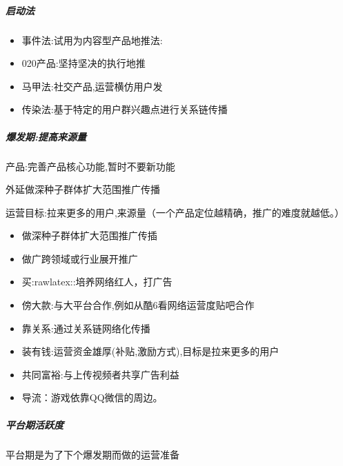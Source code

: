 \documentclass[letterpaper,10pt,english]{sphinxmanual}
\begin{document}
\subparagraph{启动法}
\label{\detokenize{chapter_idea/GTM:id10}}\begin{itemize}
\item {} 
事件法:试用为内容型产品地推法:

\item {} 
020产品:坚持坚决的执行地推

\item {} 
马甲法:社交产品,运营横仿用户发

\item {} 
传染法:基于特定的用户群兴趣点进行关系链传播

\end{itemize}


\subparagraph{爆发期:提高来源量}
\label{\detokenize{chapter_idea/GTM:id11}}
产品:完善产品核心功能,暂时不要新功能

外延做深种子群体扩大范围推广传播

运营目标:拉来更多的用户,来源量（一个产品定位越精确，推广的难度就越低。）
\begin{itemize}
\item {} 
做深种子群体扩大范围推广传插

\item {} 
做广跨领域或行业展开推广

\item {} 
买:raw\sphinxhyphen{}latex::培养网络红人，打广告

\item {} 
傍大款:与大平台合作,例如从酷6看网络运营度贴吧合作%
\begin{footnote}[468]\sphinxAtStartFootnote
{}
%
\end{footnote}

\item {} 
靠关系:通过关系链网络化传播

\item {} 
装有钱:运营资金雄厚(补贴,激励方式),目标是拉来更多的用户

\item {} 
共同富裕:与上传视频者共享广告利益

\item {} 
导流：游戏依靠QQ微信的周边。

\end{itemize}


\subparagraph{平台期活跃度}
\label{\detokenize{chapter_idea/GTM:id12}}
平台期是为了下个爆发期而做的运营准备
\end{document}
